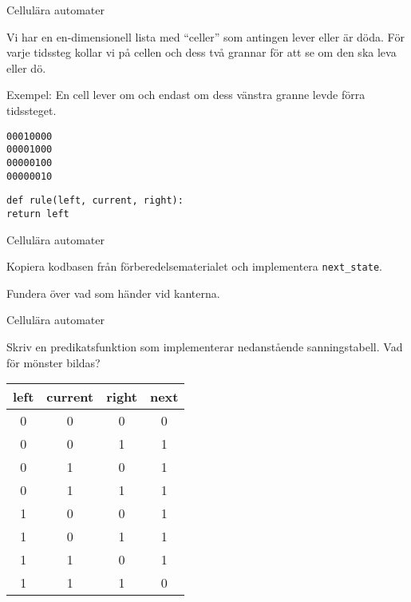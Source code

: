 \documentclass{beamer}
\begin{document}
  \begin{frame}{Cellulära automater}

    Vi har en en-dimensionell lista med ``celler'' som antingen lever eller är
    döda. För varje tidssteg kollar vi på cellen och dess två grannar för att se
    om den ska leva eller dö.

    \pause{}

    Exempel: En cell lever om och endast om dess vänstra granne levde förra
    tidssteget.

    \pause{}

    \small
    \texttt{00010000} \\
    \texttt{00001000} \\
    \texttt{00000100} \\
    \texttt{00000010}

    \pause{}

    \texttt{def rule(left, current, right):}\\\pause{}
    \hspace{4em}\texttt{return left}

  \end{frame}

  \begin{frame}[fragile]{Cellulära automater}

    Kopiera kodbasen från förberedelsematerialet och
    implementera \texttt{next\_state}.

    Fundera över vad som händer vid kanterna.

  \end{frame}

  \begin{frame}[fragile]{Cellulära automater}

    Skriv en predikatsfunktion som implementerar nedanstående sanningstabell.
    Vad för mönster bildas?

    \begin{tabular}{|c c c||c|}
      \hline
      left & current & right & next \\\hline
      0 & 0 & 0 & 0 \\
      0 & 0 & 1 & 1 \\
      0 & 1 & 0 & 1 \\
      0 & 1 & 1 & 1 \\\hline
      1 & 0 & 0 & 1 \\
      1 & 0 & 1 & 1 \\
      1 & 1 & 0 & 1 \\
      1 & 1 & 1 & 0 \\\hline
    \end{tabular}

  \end{frame}
\end{document}
